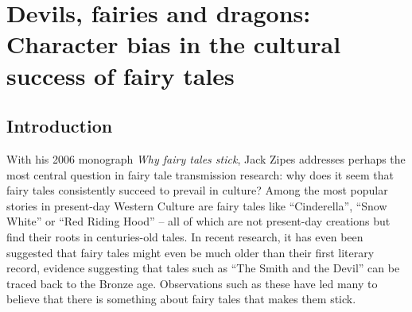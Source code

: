
\chapter[Character Bias in the Cultural Success of Fairy Tales]{Devils, fairies and dragons: Character bias in the cultural success of fairy tales}\label{ch:animacy}


\section{Introduction}\label{sec:cultural-success-intro}

With his 2006 monograph \emph{Why fairy tales stick}, Jack Zipes addresses perhaps the most central question in fairy tale transmission research: why does it seem that fairy tales consistently succeed to prevail in culture?\autocite{zipes:2006} Among the most popular stories in present-day Western Culture are fairy tales like ``Cinderella'', ``Snow White'' or ``Red Riding Hood'' -- all of which are not present-day creations but find their roots in centuries-old tales. In recent research, it has even been suggested that fairy tales might even be much older than their first literary record, evidence suggesting that tales such as ``The Smith and the Devil'' can be traced back to the Bronze age.\autocite{daSilva:2016} Observations such as these have led many to believe that there is something about fairy tales that makes them stick.

